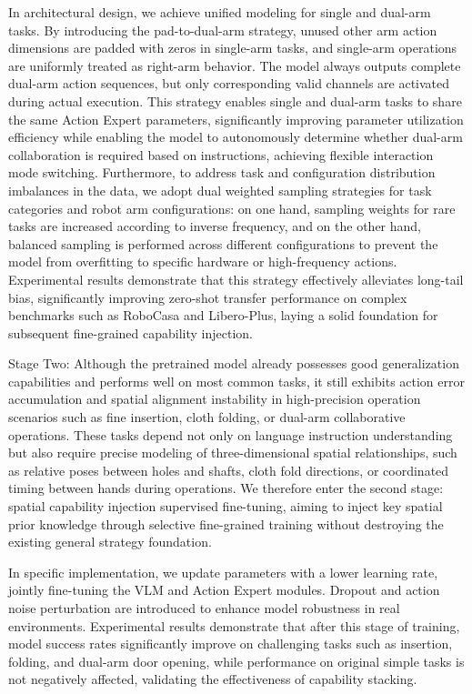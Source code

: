 \documentclass[11pt,a4paper]{article}
\begin{document}
In architectural design, we achieve unified modeling for single and dual-arm tasks. By introducing the pad-to-dual-arm strategy, unused other arm action dimensions are padded with zeros in single-arm tasks, and single-arm operations are uniformly treated as right-arm behavior. The model always outputs complete dual-arm action sequences, but only corresponding valid channels are activated during actual execution. This strategy enables single and dual-arm tasks to share the same Action Expert parameters, significantly improving parameter utilization efficiency while enabling the model to autonomously determine whether dual-arm collaboration is required based on instructions, achieving flexible interaction mode switching. Furthermore, to address task and configuration distribution imbalances in the data, we adopt dual weighted sampling strategies for task categories and robot arm configurations: on one hand, sampling weights for rare tasks are increased according to inverse frequency, and on the other hand, balanced sampling is performed across different configurations to prevent the model from overfitting to specific hardware or high-frequency actions. Experimental results demonstrate that this strategy effectively alleviates long-tail bias, significantly improving zero-shot transfer performance on complex benchmarks such as RoboCasa and Libero-Plus, laying a solid foundation for subsequent fine-grained capability injection.

Stage Two: Although the pretrained model already possesses good generalization capabilities and performs well on most common tasks, it still exhibits action error accumulation and spatial alignment instability in high-precision operation scenarios such as fine insertion, cloth folding, or dual-arm collaborative operations. These tasks depend not only on language instruction understanding but also require precise modeling of three-dimensional spatial relationships, such as relative poses between holes and shafts, cloth fold directions, or coordinated timing between hands during operations. We therefore enter the second stage: spatial capability injection supervised fine-tuning, aiming to inject key spatial prior knowledge through selective fine-grained training without destroying the existing general strategy foundation.

In specific implementation, we update parameters with a lower learning rate, jointly fine-tuning the VLM and Action Expert modules. Dropout and action noise perturbation are introduced to enhance model robustness in real environments. Experimental results demonstrate that after this stage of training, model success rates significantly improve on challenging tasks such as insertion, folding, and dual-arm door opening, while performance on original simple tasks is not negatively affected, validating the effectiveness of capability stacking.
\end{document}
